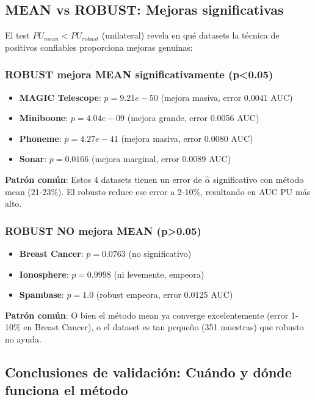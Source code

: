 \documentclass[a4paper,11pt]{article}
\begin{document}
\subsection{MEAN vs ROBUST: Mejoras significativas}

El test $PU_{mean} < PU_{robust}$ (unilateral) revela en qué datasets la técnica de positivos confiables proporciona mejoras genuinas:

\subsubsection{ROBUST mejora MEAN significativamente (p<0.05)}

\begin{itemize}
    \item \textbf{MAGIC Telescope}: $p = 9.21e-50$ (mejora masiva, error 0.0041 AUC)
    \item \textbf{Miniboone}: $p = 4.04e-09$ (mejora grande, error 0.0056 AUC)
    \item \textbf{Phoneme}: $p = 4.27e-41$ (mejora masiva, error 0.0080 AUC)
    \item \textbf{Sonar}: $p = 0.0166$ (mejora marginal, error 0.0089 AUC)
\end{itemize}

\textbf{Patrón común}: Estos 4 datasets tienen un error de $\hat{\alpha}$ significativo con método mean (21-23\%). El robusto reduce ese error a 2-10\%, resultando en AUC PU más alto.

\subsubsection{ROBUST NO mejora MEAN (p>0.05)}

\begin{itemize}
    \item \textbf{Breast Cancer}: $p = 0.0763$ (no significativo)
    \item \textbf{Ionosphere}: $p = 0.9998$ (ni levemente, empeora)
    \item \textbf{Spambase}: $p = 1.0$ (robust empeora, error 0.0125 AUC)
\end{itemize}

\textbf{Patrón común}: O bien el método mean ya converge excelentemente (error 1-10\% en Breast Cancer), o el dataset es tan pequeño (351 muestras) que robusto no ayuda.

\subsection{Conclusiones de validación: Cuándo y dónde funciona el método}
\end{document}
